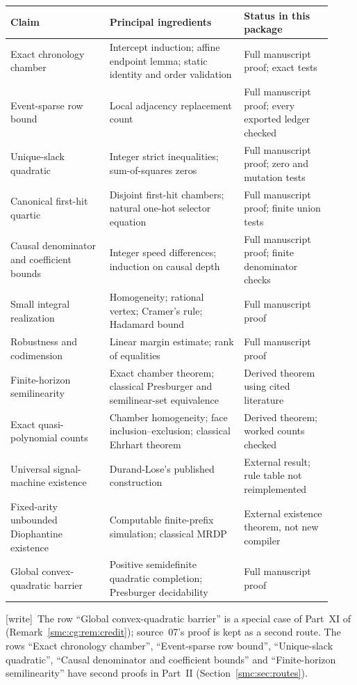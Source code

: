\documentclass[11pt,letterpaper]{article}
\numberwithin{equation}{section}
\theoremstyle{definition}
\theoremstyle{remark}
\newcommand{\wtag}{\textup{[write]}}
\begin{document}
\begin{longtable}{>{\RaggedRight\arraybackslash}p{0.29\linewidth}>{\RaggedRight\arraybackslash}p{0.38\linewidth}>{\RaggedRight\arraybackslash}p{0.25\linewidth}}
\toprule
Claim & Principal ingredients & Status in this package\\
\midrule
\endhead
Exact chronology chamber & Intercept induction; affine endpoint lemma;
static identity and order validation & Full manuscript proof; exact tests\\
Event-sparse row bound & Local adjacency replacement count & Full manuscript
proof; every exported ledger checked\\
Unique-slack quadratic & Integer strict inequalities; sum-of-squares zeros &
Full manuscript proof; zero and mutation tests\\
Canonical first-hit quartic & Disjoint first-hit chambers; natural one-hot
selector equation & Full manuscript proof; finite union tests\\
Causal denominator and coefficient bounds & Integer speed differences;
induction on causal depth & Full manuscript proof; finite denominator checks\\
Small integral realization & Homogeneity; rational vertex; Cramer's rule;
Hadamard bound & Full manuscript proof\\
Robustness and codimension & Linear margin estimate; rank of equalities &
Full manuscript proof\\
Finite-horizon semilinearity & Exact chamber theorem; classical Presburger
and semilinear-set equivalence & Derived theorem using cited literature\\
Exact quasi-polynomial counts & Chamber homogeneity; face inclusion--exclusion;
classical Ehrhart theorem & Derived theorem; worked counts checked\\
Universal signal-machine existence & Durand-Lose's published construction &
External result; rule table not reimplemented\\
Fixed-arity unbounded Diophantine existence & Computable finite-prefix
simulation; classical MRDP & External existence theorem, not new compiler\\
Global convex-quadratic barrier & Positive semidefinite quadratic completion;
Presburger decidability & Full manuscript proof\\
\bottomrule
\end{longtable}

\wtag\ The row ``Global convex-quadratic barrier'' is a special case of Part~XI of~\cite{cdc} (Remark~\ref{smc:cg:rem:credit}); source~07's proof is kept as a second route. The rows ``Exact chronology chamber'', ``Event-sparse row bound'', ``Unique-slack quadratic'', ``Causal denominator and coefficient bounds'' and ``Finite-horizon semilinearity'' have second proofs in Part~II (Section~\ref{smc:sec:routes}).
\end{document}
